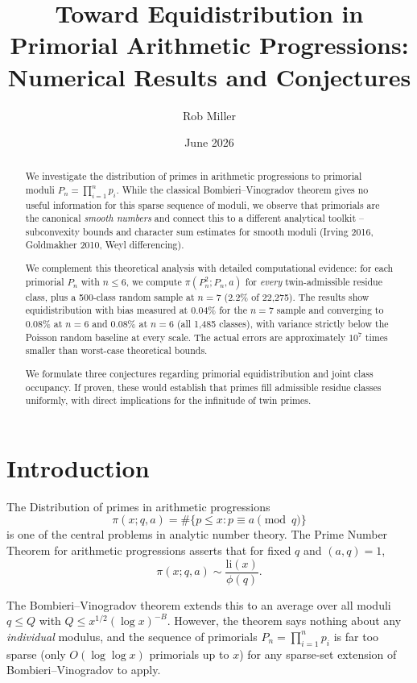 \documentclass[11pt]{article}
\title{Toward Equidistribution in Primorial Arithmetic Progressions: \\
    Numerical Results and Conjectures}
\author{Rob Miller}
\date{June 2026}
\begin{document}
\maketitle

\begin{abstract}
We investigate the distribution of primes in arithmetic progressions to
primorial moduli $P_n = \prod_{i=1}^n p_i$. While the classical
Bombieri--Vinogradov theorem gives no useful information for this sparse
sequence of moduli, we observe that primorials are the canonical \emph{smooth
numbers} and connect this to a different analytical toolkit -- subconvexity
bounds and character sum estimates for smooth moduli (Irving 2016,
Goldmakher 2010, Weyl differencing).

We complement this theoretical analysis with detailed computational evidence:
for each primorial $P_n$ with $n \leq 6$, we compute $\pi(P_n^2; P_n, a)$
for \emph{every} twin-admissible residue class, plus a 500-class random sample
at $n=7$ (2.2\% of 22{,}275). The results show equidistribution with bias
measured at 0.04\% for the $n=7$ sample and
converging to 0.08\% at $n=6$ and 0.08\% at $n=6$ (all 1{,}485 classes),
with variance strictly below the Poisson random baseline at every scale.
The actual errors are approximately $10^7$ times smaller than worst-case
theoretical bounds.

We formulate three conjectures regarding primorial equidistribution and
joint class occupancy. If proven, these would establish that primes fill
admissible residue classes uniformly, with direct implications for
the infinitude of twin primes.
\end{abstract}

\section{Introduction}

The Distribution of primes in arithmetic progressions
\begin{equation}
\pi(x; q, a) = \#\{p \leq x : p \equiv a \!\!\!\pmod q\}
\end{equation}
is one of the central problems in analytic number theory. The Prime Number
Theorem for arithmetic progressions asserts that for fixed $q$ and $(a,q)=1$,
\begin{equation}
\pi(x; q, a) \sim \frac{\mathrm{li}(x)}{\phi(q)}.
\end{equation}

The Bombieri--Vinogradov theorem \cite{bombieri1965, vinogradov1965} extends
this to an average over all moduli $q \leq Q$ with $Q \leq x^{1/2}(\log x)^{-B}$.
However, the theorem says nothing about any \emph{individual} modulus, and
the sequence of primorials $P_n = \prod_{i=1}^n p_i$ is far too sparse (only
$O(\log\log x)$ primorials up to $x$) for any sparse-set extension of
Bombieri--Vinogradov \cite{baier2006, baker2012} to apply.
\end{document}
